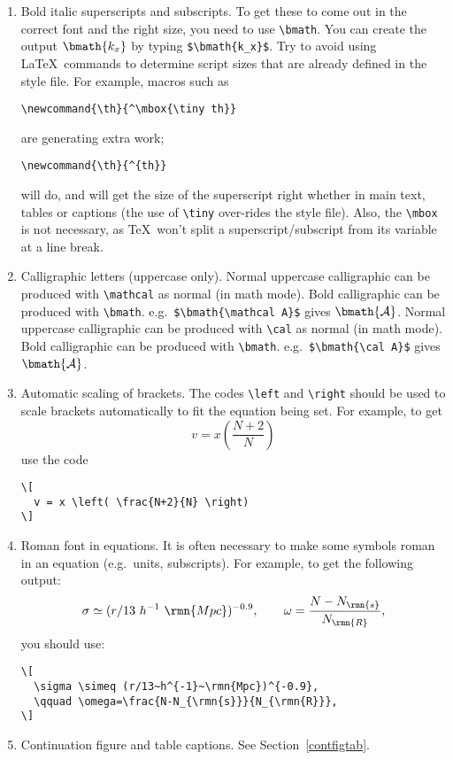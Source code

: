 \begin{enumerate}
\item Bold italic superscripts and subscripts. To get  these 
to  come  out  in the correct font and the right  size,  
you need to use \verb"\bmath". You can create the output
$\bmath{k_x}$ by typing \verb"$\bmath{k_x}$".
Try to avoid using \LaTeX\ commands to determine script sizes 
that are already  defined in the style file. For example, macros such as
%
\begin{verbatim}        
\newcommand{\th}{^\mbox{\tiny th}}
\end{verbatim}
%        
are generating extra work;
%
\begin{verbatim}
\newcommand{\th}{^{th}}
\end{verbatim}
%
will do, and  will get  the  size  of the superscript right whether  
in  main  text, tables or captions (the use of \verb"\tiny" over-rides 
the style  file). 
Also, the \verb"\mbox" is not necessary, as \TeX\ won't split a 
superscript/subscript from its variable at a line break.

\item Calligraphic letters (uppercase only).
%
\ifnfsstwo
%
Normal uppercase calligraphic can be produced with \verb"\mathcal" as
normal (in math mode). Bold calligraphic can be produced with \verb"\bmath".
e.g.\ \verb"$\bmath{\mathcal A}$" gives $\bmath{\mathcal A}$.
%
\else
%
Normal uppercase calligraphic can be produced with \verb"\cal" as
normal (in math mode). Bold calligraphic can be produced with \verb"\bmath".
e.g.\ \verb"$\bmath{\cal A}$" gives $\bmath{\cal A}$.
%
\fi

\item Automatic scaling of brackets. The codes \verb"\left" and  
\verb"\right" should  be used to scale brackets automatically to
fit the equation being set. For example, to get
\[
  v = x \left( \frac{N+2}{N} \right)
\]        
use the code
%
\begin{verbatim}
\[
  v = x \left( \frac{N+2}{N} \right)
\]        
\end{verbatim}        
        
\item Roman font in equations. It is often necessary to make some 
symbols roman in an equation (e.g.\ units, subscripts). For  example, 
to get the following output:
\[
  \sigma \simeq (r/13~h^{-1}~\rmn{Mpc})^{-0.9}, 
  \qquad \omega = \frac{N-N_{\rmn{s}}}{N_{\rmn{R}}},
\]
you should use:
%
\begin{verbatim}
\[
  \sigma \simeq (r/13~h^{-1}~\rmn{Mpc})^{-0.9}, 
  \qquad \omega=\frac{N-N_{\rmn{s}}}{N_{\rmn{R}}},
\]
\end{verbatim}

\item Continuation figure and table captions.
See Section~\ref{contfigtab}.
\end{enumerate}


